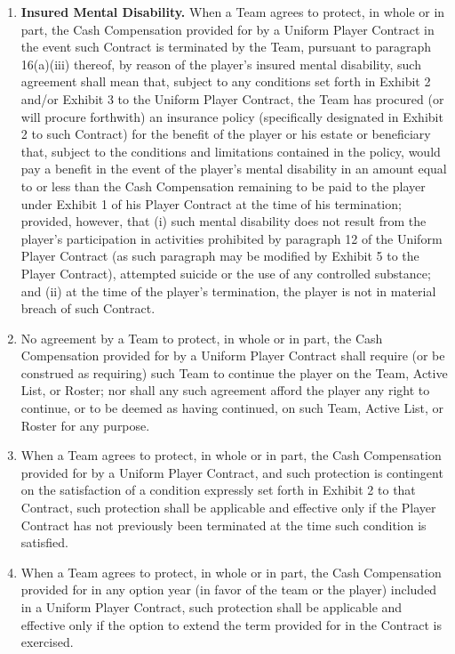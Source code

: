 \documentclass[
]{book}
\begin{document}
\begin{enumerate}
\item
  \textbf{Insured Mental Disability.} When a Team agrees to protect, in whole or in part, the Cash Compensation provided for by a Uniform Player Contract in the event such Contract is terminated by the Team, pursuant to paragraph 16(a)(iii) thereof, by reason of the player's insured mental disability, such agreement shall mean that, subject to any conditions set forth in Exhibit 2 and/or Exhibit 3 to the Uniform Player Contract, the Team has procured (or will procure forthwith) an insurance policy (specifically designated in Exhibit 2 to such Contract) for the benefit of the player or his estate or beneficiary that, subject to the conditions and limitations contained in the policy, would pay a benefit in the event of the player's mental disability in an amount equal to or less than the Cash Compensation remaining to be paid to the player under Exhibit 1 of his Player Contract at the time of his termination; provided, however, that (i) such mental disability does not result from the player's participation in activities prohibited by paragraph 12 of the Uniform Player Contract (as such paragraph may be modified by Exhibit 5 to the Player Contract), attempted suicide or the use of any controlled substance; and (ii) at the time of the player's termination, the player is not in material breach of such Contract.
\item
  No agreement by a Team to protect, in whole or in part, the Cash Compensation provided for by a Uniform Player Contract shall require (or be construed as requiring) such Team to continue the player on the Team, Active List, or Roster; nor shall any such agreement afford the player any right to continue, or to be deemed as having continued, on such Team, Active List, or Roster for any purpose.
\item
  When a Team agrees to protect, in whole or in part, the Cash Compensation provided for by a Uniform Player Contract, and such protection is contingent on the satisfaction of a condition expressly set forth in Exhibit 2 to that Contract, such protection shall be applicable and effective only if the Player Contract has not previously been terminated at the time such condition is satisfied.
\item
  When a Team agrees to protect, in whole or in part, the Cash Compensation provided for in any option year (in favor of the team or the player) included in a Uniform Player Contract, such protection shall be applicable and effective only if the option to extend the term provided for in the Contract is exercised.
\end{enumerate}
\end{document}
